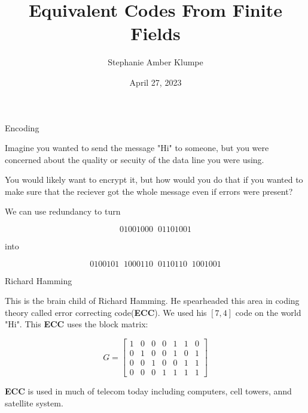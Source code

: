 \documentclass{beamer}
\title{Equivalent Codes From Finite Fields}
\author{Stephanie Amber Klumpe}
\institute{University of Colorado at Colorado Springs}
\date{April 27, 2023}
\begin{document}
\begin{frame}
    \titlepage
\end{frame}

    


\begin{frame}{Encoding}
    
    Imagine you wanted to send the message "Hi" to someone, but you were concerned about the quality
    or secuity of the data line you were using.

    \medskip

    \pause

    You would likely want to encrypt it, but how would you do that if you wanted to make sure that the
    reciever got the whole message even if errors were present?

    \medskip

    \pause

    We can use redundancy to turn
    
    $$01001000\;\;01101001$$
    
    into
    
    $$0100101\;\;1000110\;\;0110110\;\;1001001$$

\end{frame}

\begin{frame}{Richard Hamming}
    
    This is the brain child of Richard Hamming. He spearheaded this area in coding theory called error
    correcting code(\textbf{ECC}). We used his $[7,4]$ code on the world "Hi". This \textbf{ECC} uses
    the block matrix:

    $$G=\left[\begin{array}{ccccccc}
        1 & 0 & 0 & 0 & 1 & 1 & 0 \\
        0 & 1 & 0 & 0 & 1 & 0 & 1 \\
        0 & 0 & 1 & 0 & 0 & 1 & 1 \\
        0 & 0 & 0 & 1 & 1 & 1 & 1
    \end{array}\right]$$

    \bigskip

    \pause

    \textbf{ECC} is used in much of telecom today including computers, cell towers, annd satellite system.

\end{frame}
\end{document}
